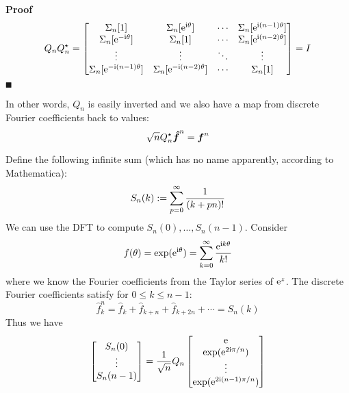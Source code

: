 \textbf{Proof}
\[
Q_n Q_n^\ensuremath{\star}  = \begin{bmatrix} \ensuremath{\Sigma}_n[1] & \ensuremath{\Sigma}_n[{\rm e}^{\I \ensuremath{\theta}}] & \ensuremath{\cdots} & \ensuremath{\Sigma}_n[{\rm e}^{\I (n-1) \ensuremath{\theta}}] \\
                            \ensuremath{\Sigma}_n[{\rm e}^{-\I \ensuremath{\theta}}] & \ensuremath{\Sigma}_n[1] & \ensuremath{\cdots} & \ensuremath{\Sigma}_n[{\rm e}^{\I (n-2) \ensuremath{\theta}}] \\
                            \ensuremath{\vdots} & \ensuremath{\vdots} & \ensuremath{\ddots} & \ensuremath{\vdots} \\
                            \ensuremath{\Sigma}_n[{\rm e}^{-\I(n-1) \ensuremath{\theta}}] & \ensuremath{\Sigma}_n[{\rm e}^{-\I(n-2) \ensuremath{\theta}}] & \ensuremath{\cdots} & \ensuremath{\Sigma}_n[1]
                            \end{bmatrix} = I
\]
\ensuremath{\QED}

In other words, $Q_n$ is easily inverted and we also have a map from discrete Fourier coefficients back to values:
\[
\sqrt{n} Q_n^\star {\mbox{\boldmath$\hat f$\unboldmath}}^n = \bm{{\mbox{\boldmath$f$\unboldmath}}}^n
\]
\begin{example} Define the following infinite sum (which has no name apparently, according to Mathematica):
\[
S_n(k) := \ensuremath{\sum}_{p=0}^\ensuremath{\infty} {1 \over (k+pn)!}
\]
We can use the DFT to compute $S_n(0), \ensuremath{\ldots}, S_n(n-1)$. Consider
\[
f(\theta) = \exp({\rm e}^{{\rm i} \theta}) = \sum_{k=0}^\infty {{\rm e}^{{\rm i}k \ensuremath{\theta}} \over k!}
\]
where we know the Fourier coefficients from the Taylor series of ${\rm e}^z$. The discrete Fourier coefficients satisfy for $0 \ensuremath{\leq} k \ensuremath{\leq} n-1$:
\[
\hat f_k^n = \hat f_k + \hat f_{k+n} + \hat f_{k+2n} + \ensuremath{\cdots} = S_n(k)
\]
Thus we have
\[
\begin{bmatrix}
S_n(0) \\
\vdots \\
S_n(n-1)
\end{bmatrix} = {1 \over \sqrt{n}} Q_n \begin{bmatrix} {\rm e} \\
                                \exp({\rm e}^{2{\rm i} \pi/n}) \\
                                \vdots \\
                                \exp({\rm e}^{2{\rm i} (n-1) \pi/n}) \end{bmatrix}
\]
\end{example}

